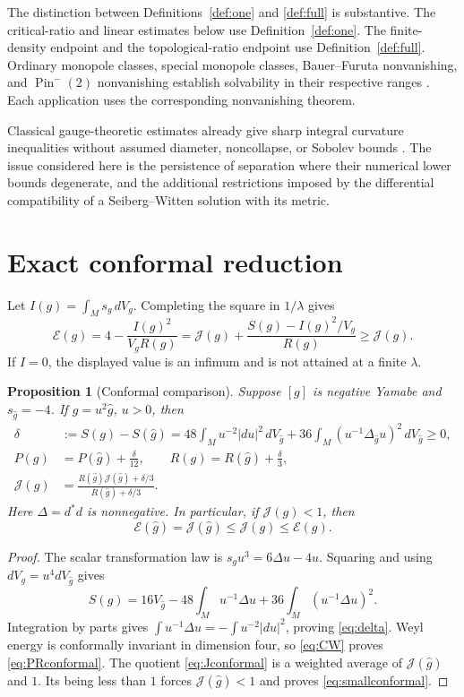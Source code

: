 \documentclass[11pt,a4paper]{article}
\newtheorem{proposition}[theorem]{Proposition}
\theoremstyle{definition}
\theoremstyle{remark}
\newcommand{\J}{\mathcal J}
\newcommand{\E}{\mathcal E}
\begin{document}
The distinction between Definitions~\ref{def:one} and \ref{def:full} is substantive. The critical-ratio and linear estimates below use Definition~\ref{def:one}. The finite-density endpoint and the topological-ratio endpoint use Definition~\ref{def:full}. Ordinary monopole classes, special monopole classes, Bauer--Furuta nonvanishing, and $\operatorname{Pin}^{-}(2)$ nonvanishing establish solvability in their respective ranges \cite{LeBrun2001,Kotschick2003,IshidaLeBrun,Pin}. Each application uses the corresponding nonvanishing theorem.

Classical gauge-theoretic estimates already give sharp integral curvature inequalities without assumed diameter, noncollapse, or Sobolev bounds \cite{LeBrun2001,LeBrunConvex}. The issue considered here is the persistence of separation where their numerical lower bounds degenerate, and the additional restrictions imposed by the differential compatibility of a Seiberg--Witten solution with its metric.

\section{Exact conformal reduction}
Let $I(g)=\int_Ms_g\,dV_g$. Completing the square in $1/\lambda$ gives
\begin{equation}
 \E(g)=4-\frac{I(g)^2}{V_gR(g)}
 =\J(g)+\frac{S(g)-I(g)^2/V_g}{R(g)}\ge\J(g).
 \label{eq:EJ}
\end{equation}
If $I=0$, the displayed value is an infimum and is not attained at a finite $\lambda$.

\begin{proposition}[Conformal comparison]\label{prop:conformal}
Suppose $[g]$ is negative Yamabe and $s_{\widehat g}=-4$. If $g=u^2\widehat g$, $u>0$, then
\begin{align}
 \delta&:=S(g)-S(\widehat g)
 =48\int_Mu^{-2}|du|^2\,dV_{\widehat g}
 +36\int_M(u^{-1}\Delta_{\widehat g}u)^2\,dV_{\widehat g}\ge0,\label{eq:delta}\\
 P(g)&=P(\widehat g)+\frac{\delta}{12},\qquad
 R(g)=R(\widehat g)+\frac{\delta}{3},\label{eq:PRconformal}\\
 \J(g)&=\frac{R(\widehat g)\J(\widehat g)+\delta/3}
 {R(\widehat g)+\delta/3}.\label{eq:Jconformal}
\end{align}
Here $\Delta=d^*d$ is nonnegative. In particular, if $\J(g)<1$, then
\begin{equation}
 \E(\widehat g)=\J(\widehat g)\le\J(g)\le\E(g).
 \label{eq:smallconformal}
\end{equation}
\end{proposition}
\begin{proof}
The scalar transformation law is $s_gu^3=6\Delta u-4u$. Squaring and using $dV_g=u^4dV_{\widehat g}$ gives
\[
 S(g)=16V_{\widehat g}-48\int_Mu^{-1}\Delta u
       +36\int_M(u^{-1}\Delta u)^2.
\]
Integration by parts gives $\int u^{-1}\Delta u=-\int u^{-2}|du|^2$, proving \eqref{eq:delta}. Weyl energy is conformally invariant in dimension four, so \eqref{eq:CW} proves \eqref{eq:PRconformal}. The quotient \eqref{eq:Jconformal} is a weighted average of $\J(\widehat g)$ and $1$. Its being less than $1$ forces $\J(\widehat g)<1$ and proves \eqref{eq:smallconformal}.
\end{proof}
\end{document}
